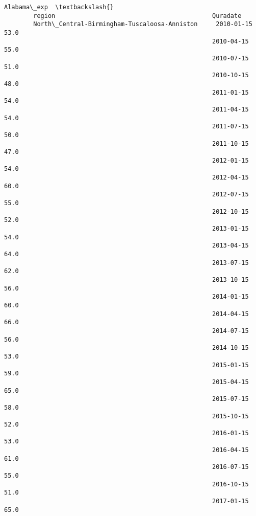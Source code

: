 \documentclass[11pt]{article}
\begin{document}
\begin{Verbatim}[commandchars=\\\{\}]
                                                                     Alabama\_exp  \textbackslash{}
        region                                           Quradate                  
        North\_Central-Birmingham-Tuscaloosa-Anniston     2010-01-15         53.0   
                                                         2010-04-15         55.0   
                                                         2010-07-15         51.0   
                                                         2010-10-15         48.0   
                                                         2011-01-15         54.0   
                                                         2011-04-15         54.0   
                                                         2011-07-15         50.0   
                                                         2011-10-15         47.0   
                                                         2012-01-15         54.0   
                                                         2012-04-15         60.0   
                                                         2012-07-15         55.0   
                                                         2012-10-15         52.0   
                                                         2013-01-15         54.0   
                                                         2013-04-15         64.0   
                                                         2013-07-15         62.0   
                                                         2013-10-15         56.0   
                                                         2014-01-15         60.0   
                                                         2014-04-15         66.0   
                                                         2014-07-15         56.0   
                                                         2014-10-15         53.0   
                                                         2015-01-15         59.0   
                                                         2015-04-15         65.0   
                                                         2015-07-15         58.0   
                                                         2015-10-15         52.0   
                                                         2016-01-15         53.0   
                                                         2016-04-15         61.0   
                                                         2016-07-15         55.0   
                                                         2016-10-15         51.0   
                                                         2017-01-15         65.0   

\end{Verbatim}
\end{document}
